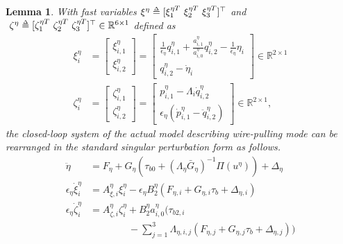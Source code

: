 \documentclass[letterpaper, 10 pt, conference]{ieeeconf}  %
\def\delequal{\mathrel{\ensurestackMath{\stackon[1pt]{=}{\scriptscriptstyle\Delta}}}}
\newtheorem{lemma}{Lemma}
\theoremstyle{definition}
\begin{document}
\begin{lemma} \label{lemma for standard singular form}
With fast variables $\xi^{\eta} \delequal [\xi^{\eta T}_1 \ \xi^{\eta T}_2 \ \xi^{\eta T}_3]^{\top}$ and $\ \zeta^{\eta} \delequal [\zeta^{\eta T}_1 \ \zeta^{\eta T}_2 \ \zeta^{\eta T}_3]^{\top} \in \mathbb{R}^{6 \times 1}$ defined as 
\begin{equation} \label{eq: standard singular form of wire-pulling mode}
    \begin{split}
    \xi^{\eta}_i &= 
    \begin{bmatrix}
        \xi^{\eta}_{i, 1} \\
        \xi^{\eta}_{i, 2}
    \end{bmatrix} = 
    \begin{bmatrix}
        \frac{1}{\epsilon_{\eta}} q^{\eta}_{i, 1} + \frac{a^{\eta}_{i, 1}}{a^{\eta}_{i, 0}}q^{\eta}_{i, 2} - \frac{1}{\epsilon_{\eta}}\eta_{i}\\
        q^{\eta}_{i, 2} - \dot{\eta}_i
    \end{bmatrix} \in \mathbb{R}^{2 \times 1} \\
    \zeta^{\eta}_i &= 
    \begin{bmatrix}
        \zeta^{\eta}_{i, 1} \\
        \zeta^{\eta}_{i, 2}
    \end{bmatrix} = 
    \begin{bmatrix}
        p^{\eta}_{i, 1} - \Lambda_{i}\dot{q}^{\eta}_{i, 2}\\
        \epsilon_{\eta}(\dot{p}^{\eta}_{i, 1} - \ddot{q}^{\eta}_{i, 2})
    \end{bmatrix} \in \mathbb{R}^{2 \times 1},
    \end{split}
\end{equation}
the closed-loop system of the actual model describing wire-pulling mode can be rearranged in the standard singular perturbation form as follows.
\begin{equation}
    \begin{split}
        \ddot{\eta} &= F_{\eta} + G_{\eta}(\tau_{b 0} + (\Lambda_{\eta}\bar{G}_{\eta})^{-1}\Pi(u^{\eta}))+\Delta_{\eta} \\
        {\epsilon}_{\eta} \dot{\xi}^{\eta}_{i} &= A^{\eta}_{\xi, i}\xi^{\eta}_{i}-\epsilon_{\eta} B^{\eta}_2(F_{\eta, i} + G_{\eta, i}\tau_b + \Delta_{\eta, i}) \\ 
        {\epsilon}_{\eta} \dot{\zeta}^{\eta}_{i} &= A^{\eta}_{\zeta, i}\zeta^{\eta}_{i}+ B^{\eta}_2 a^{\eta}_{i, 0} (\tau_{b 2, i} \\ & \qquad \quad \quad - \sum_{j = 1}^{3} \Lambda_{\eta, i, j}(F_{\eta, j} + G_{\eta, j}\tau_b + \Delta_{\eta, j}))

\end{split}
\end{equation}
\end{lemma}
\end{document}
